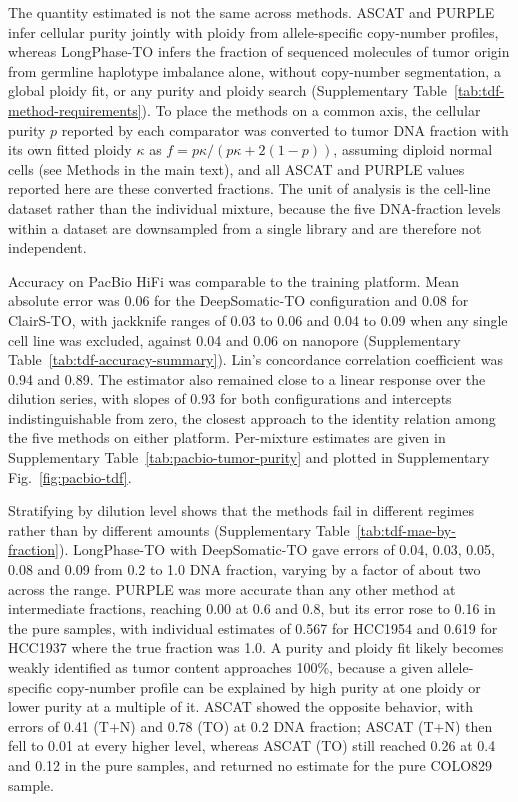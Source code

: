 \documentclass[pdflatex,sn-nature]{sn-jnl}
\begin{document}
The quantity estimated is not the same across methods. ASCAT and PURPLE infer cellular purity jointly with ploidy from allele-specific copy-number profiles, whereas LongPhase-TO infers the fraction of sequenced molecules of tumor origin from germline haplotype imbalance alone, without copy-number segmentation, a global ploidy fit, or any purity and ploidy search (Supplementary Table~\ref{tab:tdf-method-requirements}). To place the methods on a common axis, the cellular purity $p$ reported by each comparator was converted to tumor DNA fraction with its own fitted ploidy $\kappa$ as $f = p\kappa/(p\kappa + 2(1-p))$, assuming diploid normal cells (see Methods in the main text), and all ASCAT and PURPLE values reported here are these converted fractions. The unit of analysis is the cell-line dataset rather than the individual mixture, because the five DNA-fraction levels within a dataset are downsampled from a single library and are therefore not independent.

Accuracy on PacBio HiFi was comparable to the training platform. Mean absolute error was 0.06 for the DeepSomatic-TO configuration and 0.08 for ClairS-TO, with jackknife ranges of 0.03 to 0.06 and 0.04 to 0.09 when any single cell line was excluded, against 0.04 and 0.06 on nanopore (Supplementary Table~\ref{tab:tdf-accuracy-summary}). Lin's concordance correlation coefficient was 0.94 and 0.89. The estimator also remained close to a linear response over the dilution series, with slopes of 0.93 for both configurations and intercepts indistinguishable from zero, the closest approach to the identity relation among the five methods on either platform. Per-mixture estimates are given in Supplementary Table~\ref{tab:pacbio-tumor-purity} and plotted in Supplementary Fig.~\ref{fig:pacbio-tdf}.

Stratifying by dilution level shows that the methods fail in different regimes rather than by different amounts (Supplementary Table~\ref{tab:tdf-mae-by-fraction}). LongPhase-TO with DeepSomatic-TO gave errors of 0.04, 0.03, 0.05, 0.08 and 0.09 from 0.2 to 1.0 DNA fraction, varying by a factor of about two across the range. PURPLE was more accurate than any other method at intermediate fractions, reaching 0.00 at 0.6 and 0.8, but its error rose to 0.16 in the pure samples, with individual estimates of 0.567 for HCC1954 and 0.619 for HCC1937 where the true fraction was 1.0. A purity and ploidy fit likely becomes weakly identified as tumor content approaches 100\%, because a given allele-specific copy-number profile can be explained by high purity at one ploidy or lower purity at a multiple of it. ASCAT showed the opposite behavior, with errors of 0.41 (T+N) and 0.78 (TO) at 0.2 DNA fraction; ASCAT (T+N) then fell to 0.01 at every higher level, whereas ASCAT (TO) still reached 0.26 at 0.4 and 0.12 in the pure samples, and returned no estimate for the pure COLO829 sample.
\end{document}

